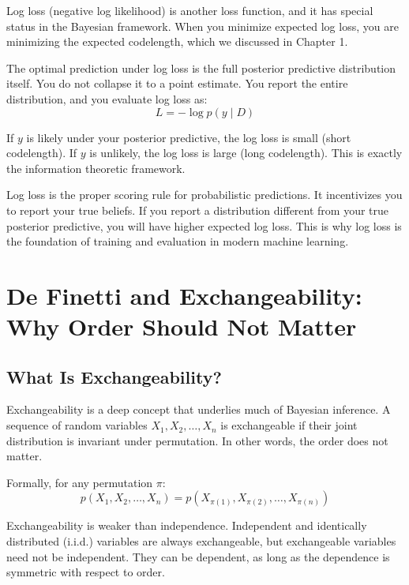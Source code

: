 Log loss (negative log likelihood) is another loss function, and it has special status in the Bayesian framework. When you minimize expected log loss, you are minimizing the expected codelength, which we discussed in Chapter 1.

The optimal prediction under log loss is the full posterior predictive distribution itself. You do not collapse it to a point estimate. You report the entire distribution, and you evaluate log loss as:
\begin{equation}
L = -\log p(y \mid D)
\end{equation}

If $y$ is likely under your posterior predictive, the log loss is small (short codelength). If $y$ is unlikely, the log loss is large (long codelength). This is exactly the information theoretic framework.

Log loss is the proper scoring rule for probabilistic predictions. It incentivizes you to report your true beliefs. If you report a distribution different from your true posterior predictive, you will have higher expected log loss. This is why log loss is the foundation of training and evaluation in modern machine learning.

\vspace{2em}

\section{De Finetti and Exchangeability: Why Order Should Not Matter}

\subsection{What Is Exchangeability?}

Exchangeability is a deep concept that underlies much of Bayesian inference. A sequence of random variables $X_1, X_2, \ldots, X_n$ is exchangeable if their joint distribution is invariant under permutation. In other words, the order does not matter.

Formally, for any permutation $\pi$:
\begin{equation}
p(X_1, X_2, \ldots, X_n) = p(X_{\pi(1)}, X_{\pi(2)}, \ldots, X_{\pi(n)})
\end{equation}

Exchangeability is weaker than independence. Independent and identically distributed (i.i.d.) variables are always exchangeable, but exchangeable variables need not be independent. They can be dependent, as long as the dependence is symmetric with respect to order.

